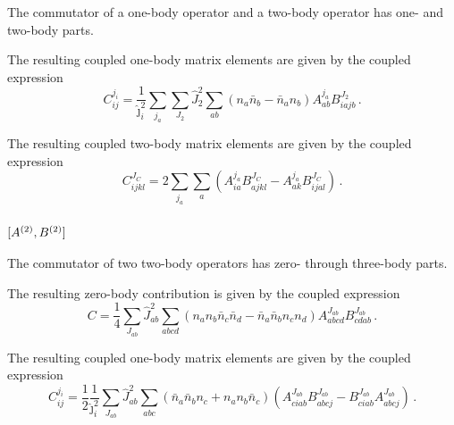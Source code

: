 The commutator of a one-body operator and a two-body operator has
one- and two-body parts.

The resulting coupled one-body matrix elements are given by the coupled expression
\begin{equation}
  C_{ij}^{j_i} = \frac{1}{\hat{\jmath}_{i}^2} \sum_{j_a} \sum_{J_2} \hat{J}_{2}^2
  \sum_{ab} (n_a \bar{n}_b - \bar{n}_a n_b) A_{ab}^{j_a} B_{iajb}^{J_2}\,.
\end{equation}

The resulting coupled two-body matrix elements are given by the coupled expression
\begin{equation}
  C_{ijkl}^{J_C} = 2 \sum_{j_a} \sum_{a} \left(
  A_{ia}^{j_a} B_{ajkl}^{J_C} - A_{ak}^{j_a} B_{ijal}^{J_C}
  \right)
  \,.
\end{equation}

\subsubsection{
  \texorpdfstring{$[{A}^{(2)}, {B}^{(2)}]$}{[2, 2]}
}

The commutator of two two-body operators has
zero- through three-body parts.

The resulting zero-body contribution is given by the coupled expression
\begin{equation}
  C = \frac{1}{4}\sum_{J_{ab}} \hat{J}_{ab}^{2}\sum_{abcd}
  (n_a n_b \bar{n}_c \bar{n}_d - \bar{n}_a \bar{n}_b n_c n_d)
  A_{abcd}^{J_{ab}} B_{cdab}^{J_{ab}}\,.
\end{equation}

The resulting coupled one-body matrix elements are given by the coupled expression
\begin{equation}
  C_{ij}^{j_i} = \frac{1}{2} \frac{1}{\hat{\jmath}_{i}^2}
  \sum_{J_{ab}} \hat{J}_{ab}^2
  \sum_{abc}
  (\bar{n}_a \bar{n}_b n_c + n_a n_b \bar{n}_c)
  (A_{ciab}^{J_{ab}} B_{abcj}^{J_{ab}} - B_{ciab}^{J_{ab}} A_{abcj}^{J_{ab}})\,.
\end{equation}

